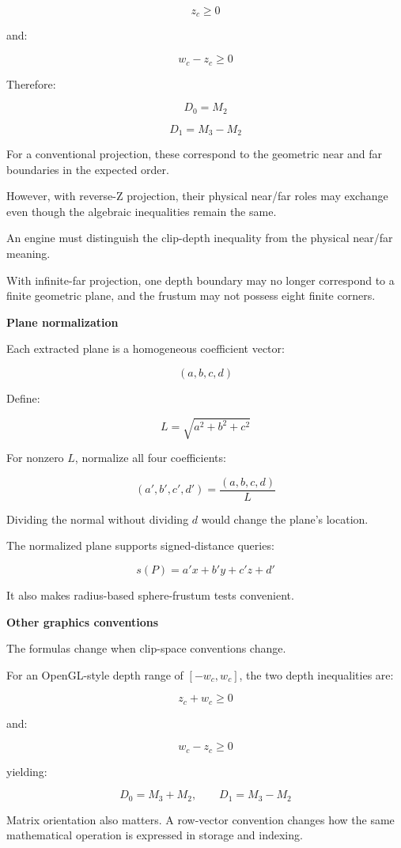 \[
z_c\ge0
\]

and:

\[
w_c-z_c\ge0
\]

Therefore:

\[
\boxed{D_0=M_2}
\]

\[
\boxed{D_1=M_3-M_2}
\]

For a conventional projection, these correspond to the geometric near and far boundaries in the expected order.

However, with reverse-Z projection, their physical near/far roles may exchange even though the algebraic inequalities remain the same.

An engine must distinguish the clip-depth inequality from the physical near/far meaning.

With infinite-far projection, one depth boundary may no longer correspond to a finite geometric plane, and the frustum may not possess eight finite corners.

\textbf{Plane normalization}

Each extracted plane is a homogeneous coefficient vector:

\[
(a,b,c,d)
\]

Define:

\[
L=\sqrt{a^2+b^2+c^2}
\]

For nonzero \(L\), normalize all four coefficients:

\[
(a',b',c',d')= \frac{(a,b,c,d)}{L}
\]

Dividing the normal without dividing \(d\) would change the plane's location.

The normalized plane supports signed-distance queries:

\[
s(P)=a'x+b'y+c'z+d'
\]

It also makes radius-based sphere-frustum tests convenient.

\textbf{Other graphics conventions}

The formulas change when clip-space conventions change.

For an OpenGL-style depth range of \([-w_c,w_c]\), the two depth inequalities are:

\[
z_c+w_c\ge0
\]

and:

\[
w_c-z_c\ge0
\]

yielding:

\[
D_0=M_3+M_2,\qquad D_1=M_3-M_2
\]

Matrix orientation also matters. A row-vector convention changes how the same mathematical operation is expressed in storage and indexing.


